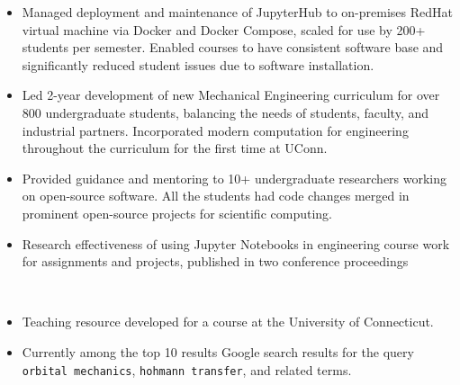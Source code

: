 \begin{itemize}
\item Managed deployment and maintenance of JupyterHub to on-premises RedHat virtual machine via Docker and Docker Compose, scaled for use by 200+ students per semester. Enabled courses to have consistent software base and significantly reduced student issues due to software installation.
\item Led 2-year development of new Mechanical Engineering curriculum for over 800 undergraduate students, balancing the needs of students, faculty, and industrial partners. Incorporated modern computation for engineering throughout the curriculum for the first time at UConn.
\item Provided guidance and mentoring to 10+ undergraduate researchers working on open-source software. All the students had code changes merged in prominent open-source projects for scientific computing.
\item Research effectiveness of using Jupyter Notebooks in engineering course work for assignments and projects, published in two conference proceedings
\end{itemize}
\sectionsep

\\
\begin{itemize}
\item Teaching resource developed for a course at the University of Connecticut.
\item Currently among the top 10 results Google search results for the query \verb|orbital mechanics|, \verb|hohmann transfer|, and related terms.
\end{itemize}
\sectionsep


